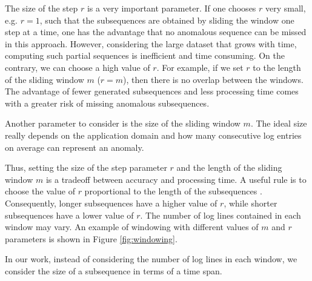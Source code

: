 The size of the step $r$ is a very important parameter. If one chooses $r$ very small, e.g. $r = 1$, such that the subsequences are obtained by sliding the window one step at a time, one has the advantage that no anomalous sequence can be missed in this approach. However, considering the large dataset that grows with time, computing such partial sequences is inefficient and time consuming. On the contrary, we can choose a high value of $r$. For example, if we set $r$ to the length of the sliding window $m$ ($r = m$), then there is no overlap between the windows. The advantage of fewer generated subsequences and less processing time comes with a greater risk of missing anomalous subsequences. 

Another parameter to consider is the size of the sliding window $m$. The ideal size really depends on the application domain and how many consecutive log entries on average can represent an anomaly. 

Thus, setting the size of the step parameter $r$ and the length of the sliding window $m$ is a tradeoff between accuracy and processing time. A useful rule is to choose the value of $r$ proportional to the length of the subsequences \cite{izakian2013}. Consequently, longer subsequences have a higher value of $r$, while shorter subsequences have a lower value of $r$. The number of log lines contained in each window may vary. An example of windowing with different values of $m$ and $r$ parameters is shown in Figure \ref{fig:windowing}.

In our work, instead of considering the number of log lines in each window, we consider the size of a subsequence in terms of a time span.

